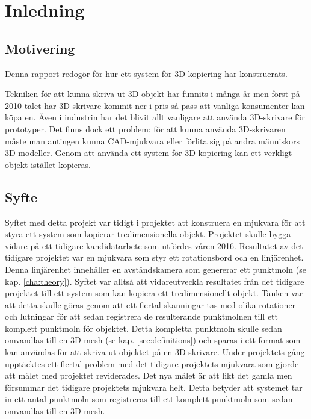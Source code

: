 \chapter{Inledning}
\label{cha:introduction}

\section{Motivering}
\label{sec:motivation}

Denna rapport redogör för hur ett system för 3D-kopiering har konstruerats. 

Tekniken för att kunna skriva ut 3D-objekt har funnits i många år men först på 2010-talet har 3D-skrivare kommit ner i pris så pass att vanliga konsumenter kan köpa en. Även i industrin har det blivit allt vanligare att använda 3D-skrivare för prototyper. Det finns dock ett problem: för att kunna använda 3D-skrivaren måste man antingen kunna CAD-mjukvara eller förlita sig på andra människors 3D-modeller. Genom att använda ett system för 3D-kopiering kan ett verkligt objekt istället kopieras.


\section{Syfte}
\label{sec:aim}

Syftet med detta projekt var tidigt i projektet att konstruera en mjukvara för att styra ett system som kopierar tredimensionella objekt. Projektet skulle bygga vidare på ett tidigare kandidatarbete som utfördes våren 2016. Resultatet av det tidigare projektet var en mjukvara som styr ett rotationsbord och en linjärenhet. Denna linjärenhet innehåller en avståndskamera som genererar ett punktmoln (se kap. \ref{cha:theory}). Syftet var alltså att vidareutveckla resultatet från det tidigare projektet till ett system som kan kopiera ett tredimensionellt objekt. Tanken var att detta skulle göras genom att ett flertal skanningar tas med olika rotationer och lutningar för att sedan registrera de resulterande punktmolnen till ett komplett punktmoln för objektet. Detta kompletta punktmoln skulle sedan omvandlas till en 3D-mesh (se kap. \ref{sec:definitions}) och sparas i ett format som kan användas för att skriva ut objektet på en 3D-skrivare.  Under projektets gång upptäcktes ett flertal problem med det tidigare projektets mjukvara som gjorde att målet med projektet reviderades. Det nya målet är att likt det gamla men försummar det tidigare projektets mjukvara helt. Detta betyder att systemet tar in ett antal punktmoln som registreras till ett komplett punktmoln som sedan omvandlas till en 3D-mesh.


